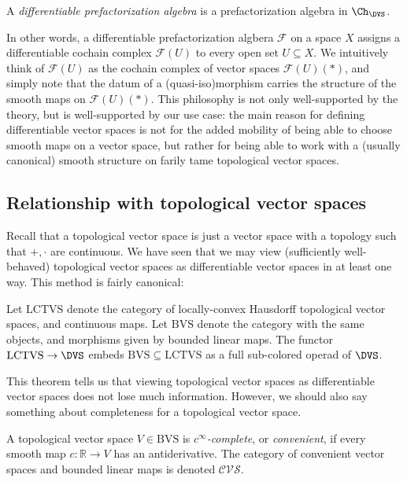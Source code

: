 \begin{definition}\label{dfn:3-5-13}
	A \emph{differentiable prefactorization algebra} is a prefactorization algebra in $\Ch_{\DVS } $.
\end{definition}

In other words, a differentiable prefactorization algbera $\mathcal{F} $ on a space $X$ assigns a differentiable cochain complex $\mathcal{F} (U)$ to every open set $U\subseteq X$. We intuitively think of $\mathcal{F} (U)$ as the cochain complex of vector spaces $\mathcal{F} (U)(*)$, and simply note that the datum of a (quasi-iso)morphism carries the structure of the smooth maps on $\mathcal{F} (U)(*)$. This philosophy is not only well-supported by the theory, but is well-supported by our use case: the main reason for defining differentiable vector spaces is not for the added mobility of being able to choose smooth maps on a vector space, but rather for being able to work with a (usually canonical) smooth structure on farily tame topological vector spaces.

\subsection{Relationship with topological vector spaces}

Recall that a topological vector space is just a vector space with a topology such that $+,\cdot $ are continuous. We have seen that we may view (sufficiently well-behaved) topological vector spaces as differentiable vector spaces in at least one way. This method is fairly canonical:
\begin{theorem}\label{thm:3-5-14}
	Let $\mathrm{LCTVS}$ denote the category of locally-convex Hausdorff topological vector spaces, and continuous maps. Let $\mathrm{BVS} $ denote the category with the same objects, and morphisms given by bounded linear maps. The functor $\mathrm{LCTVS} \to \DVS $ embeds $\mathrm{BVS} \subseteq \mathrm{LCTVS} $ as a full sub-colored operad of $\DVS $.
\end{theorem}
This theorem tells us that viewing topological vector spaces as differentiable vector spaces does not lose much information. However, we should also say something about completeness for a topological vector space.

\begin{definition}\label{dfn:3-5-15}
	A topological vector space $V\in \mathrm{BVS} $ is \emph{$c^\infty $-complete}, or \emph{convenient}, if every smooth map $c : \mathbb{R}  \to V$ has an antiderivative. The category of convenient vector spaces and bounded linear maps is denoted $\mathcal{CVS} $.
\end{definition}

